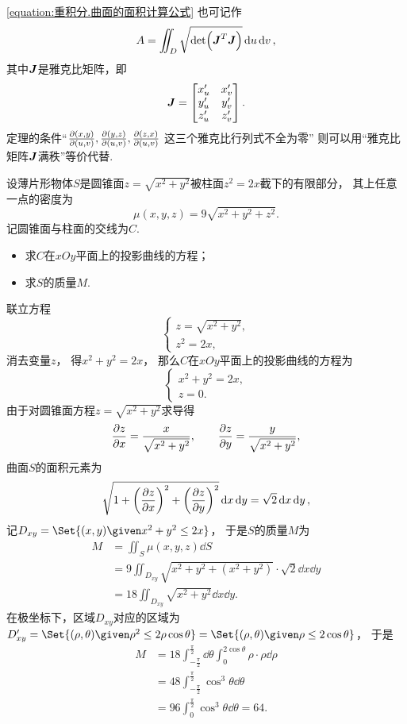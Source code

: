 \cref{equation:重积分.曲面的面积计算公式} 也可记作\[
	A = \iint_D \sqrt{\det(\boldsymbol{J}^T \boldsymbol{J})} \dd{u}\dd{v},
\]
其中\(\boldsymbol{J}\)是雅克比矩阵，即\[
	\boldsymbol{J} = \begin{bmatrix}
		x'_u & x'_v \\
		y'_u & y'_v \\
		z'_u & z'_v
	\end{bmatrix}.
\]
定理的条件“\(\pdv{ (x,y) }{ (u,v) },
\pdv{ (y,z) }{ (u,v) },
\pdv{ (z,x) }{ (u,v) }\)
这三个雅克比行列式不全为零”
则可以用“雅克比矩阵\(\boldsymbol{J}\)满秩”等价代替.


\begin{example}
设薄片形物体\(S\)是圆锥面\(z=\sqrt{x^2+y^2}\)被柱面\(z^2=2x\)截下的有限部分，
其上任意一点的密度为\[
	\mu(x,y,z) = 9\sqrt{x^2+y^2+z^2}.
\]
记圆锥面与柱面的交线为\(C\).
\begin{itemize}
	\item 求\(C\)在\(xOy\)平面上的投影曲线的方程；
	\item 求\(S\)的质量\(M\).
\end{itemize}
\begin{solution}
联立方程\[
	\begin{cases}
		z=\sqrt{x^2+y^2}, \\
		z^2=2x,
	\end{cases}
\]
消去变量\(z\)，
得\(x^2+y^2=2x\)，
那么\(C\)在\(xOy\)平面上的投影曲线的方程为\[
	\begin{cases}
		x^2+y^2=2x, \\
		z=0.
	\end{cases}
\]
由于对圆锥面方程\(z=\sqrt{x^2+y^2}\)求导得\[
	\pdv{z}{x} = \frac{x}{\sqrt{x^2+y^2}},
	\qquad
	\pdv{z}{y} = \frac{y}{\sqrt{x^2+y^2}},
\]
曲面\(S\)的面积元素为\[
	\sqrt{1+\left( \pdv{z}{x} \right)^2+\left( \pdv{z}{y} \right)^2} \dd{x}\dd{y}
	= \sqrt2 \dd{x}\dd{y},
\]
记\(D_{xy} = \Set{ (x,y) \given x^2+y^2\leq2x }\)，
于是\(S\)的质量\(M\)为\begin{align*}
	M &= \iint_S \mu(x,y,z) \dd{S} \\
	&= 9 \iint_{D_{xy}} \sqrt{x^2+y^2+(x^2+y^2)} \cdot \sqrt2 \dd{x}\dd{y} \\
	&= 18 \iint_{D_{xy}} \sqrt{x^2+y^2} \dd{x}\dd{y}.
\end{align*}
在极坐标下，区域\(D_{xy}\)对应的区域为
\(D_{xy}'
= \Set{ (\rho,\theta) \given \rho^2 \leq 2 \rho \cos\theta }
= \Set{ (\rho,\theta) \given \rho \leq 2 \cos\theta }\)，
于是\begin{align*}
	M &= 18 \int_{-\frac\pi2}^{\frac\pi2} \dd{\theta}
		\int_0^{2\cos\theta} \rho \cdot \rho \dd{\rho} \\
	&= 48 \int_{-\frac\pi2}^{\frac\pi2} \cos^3\theta \dd{\theta} \\
	&= 96 \int_0^{\frac\pi2} \cos^3\theta \dd{\theta}
	= 64.
\end{align*}
\end{solution}
\end{example}

